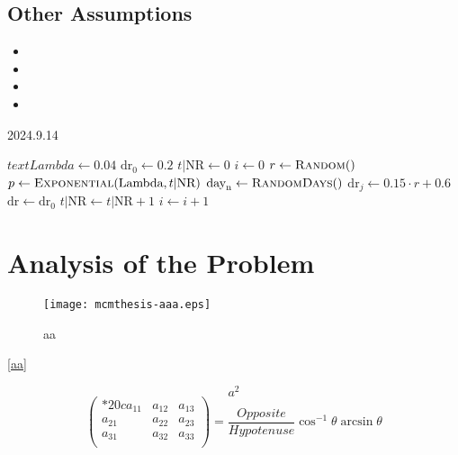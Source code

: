 \documentclass{mcmthesis}
\begin{document}
\subsection{Other Assumptions}
\lipsum[6]
\begin{itemize}
\item
\item
\item
\item
\end{itemize}

\lipsum[7]

\begin{algorithm}
  \caption{2024.9.14 }
  \begin{algorithmic}[1]
  \State $text{Lambda} \gets 0.04$
  \State $\text{dr}_0 \gets 0.2$
  \State $t|\text{NR} \gets 0$
  \State $i \gets 0$
      \State $r \gets \Call{Random}$
      \State $p \gets \Call{Exponential}{\text{Lambda}, t|\text{NR}}$
          \State $\text{day}_\text{n} \gets \Call{RandomDays}$
              \State $\text{dr}_j \gets 0.15 \cdot r + 0.6$
          \EndFor
      \Else
          \State $\text{dr} \gets \text{dr}_0$
          \State $t|\text{NR} \gets t|\text{NR} + 1$
      \EndIf
      \State $i \gets i + 1$
  \EndWhile
  \end{algorithmic}
  \end{algorithm}

\section{Analysis of the Problem}
% 
\begin{figure}[h]
\small
\centering
\texttt{[image: mcmthesis-aaa.eps]}
\caption{aa} \label{fig:aa}
\end{figure}

\lipsum[8] \eqref{aa}

\begin{equation}
a^2 \label{aa}
\end{equation}
\[
  \begin{pmatrix}{*{20}c}
  {a_{11} } & {a_{12} } & {a_{13} }  \\
  {a_{21} } & {a_{22} } & {a_{23} }  \\
  {a_{31} } & {a_{32} } & {a_{33} }  \\
  \end{pmatrix}
  = \frac{{Opposite}}{{Hypotenuse}}\cos ^{ - 1} \theta \arcsin \theta
\]
\lipsum[9]
\end{document}
